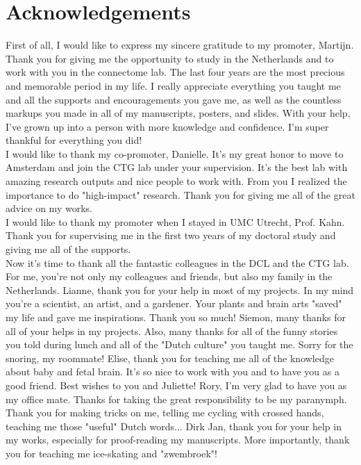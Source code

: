 \chapter{Acknowledgements}

First of all, I would like to express my sincere gratitude to my promoter, Martijn. Thank you for giving me the opportunity to study in the Netherlands and to work with you in the connectome lab. The last four years are the most precious and memorable period in my life. I really appreciate everything you taught me and all the supports and encouragements you gave me, as well as the countless markups you made in all of my manuscripts, posters, and slides. With your help, I've grown up into a person with more knowledge and confidence. I'm super thankful for everything you did!\\

\noindent
I would like to thank my co-promoter, Danielle. It's my great honor to move to Amsterdam and join the CTG lab under your supervision. It's the best lab with amazing research outputs and nice people to work with. From you I realized the importance to do "high-impact" research. Thank you for giving me all of the great advice on my works.\\

\noindent
I would like to thank my promoter when I stayed in UMC Utrecht, Prof. Kahn. Thank you for supervising me in the first two years of my doctoral study and giving me all of the supports.\\

\noindent
Now it's time to thank all the fantastic colleagues in the DCL and the CTG lab. For me, you're not only my colleagues and friends, but also my family in the Netherlands. Lianne, thank you for your help in most of my projects. In my mind you're a scientist, an artist, and a gardener. Your plants and brain arts "saved" my life and gave me inspirations. Thank you so much! Siemon, many thanks for all of your helps in my projects. Also, many thanks for all of the funny stories you told during lunch and all of the "Dutch culture" you taught me. Sorry for the snoring, my roommate! Elise, thank you for teaching me all of the knowledge about baby and fetal brain. It's so nice to work with you and to have you as a good friend. Best wishes to you and Juliette! Rory, I'm very glad to have you as my office mate. Thanks for taking the great responsibility to be my paranymph. Thank you for making tricks on me, telling me cycling with crossed hands, teaching me those "useful" Dutch words... Dirk Jan, thank you for your help in my works, especially for proof-reading my manuscripts. More importantly, thank you for teaching me ice-skating and "zwembroek"! 

